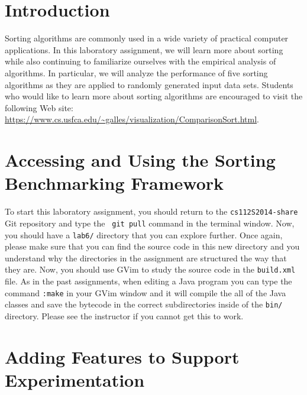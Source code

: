 


\usepackage[compact]{titlesec}


\section*{Introduction}

Sorting algorithms are commonly used in a wide variety of practical computer applications.  In this laboratory
assignment, we will learn more about sorting while also continuing to familiarize ourselves with the empirical analysis
of algorithms.  In particular, we will analyze the performance of five sorting algorithms as they are applied to
randomly generated input data sets.  Students who would like to learn more about sorting algorithms are encouraged to
visit the following Web site: \url{https://www.cs.usfca.edu/~galles/visualization/ComparisonSort.html}.

\section*{Accessing and Using the Sorting Benchmarking Framework}

To start this laboratory assignment, you should return to the {\tt cs112S2014-share} Git repository and type the {\tt
git pull} command in the terminal window.  Now, you should have a {\tt lab6/} directory that you can explore further.
Once again, please make sure that you can find the source code in this new directory and you understand why the
directories in the assignment are structured the way that they are. Now, you should use GVim to study the source code in
the {\tt build.xml} file.  As in the past assignments, when editing a Java program you can type the command {\tt :make}
in your GVim window and it will compile the all of the Java classes and save the bytecode in the correct subdirectories
inside of the {\tt bin/} directory.  Please see the instructor if you cannot get this to work.

\section*{Adding Features to Support Experimentation}

